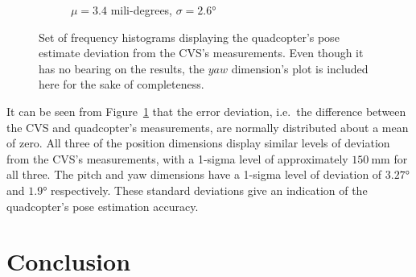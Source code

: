 \begin{figure}
\begin{subfigure}{0.48\textwidth}
    \caption{$\mu = 3.4$ mili-degrees, $\sigma = \ang{2.6}$}
  \end{subfigure}
  \caption[Set of frequency histograms displaying the quadcopter's pose estimate deviation from the CVS's measurements.]{Set of frequency histograms displaying the quadcopter's pose estimate deviation from the CVS's measurements. Even though it has no bearing on the results, the $yaw$ dimension's plot is included here for the sake of completeness.}
\label{fig:chap5-err-hist}
\end{figure}

It can be seen from Figure~\ref{fig:chap5-err-hist} that the error deviation, i.e.\ the difference between the CVS and quadcopter's measurements, are normally distributed about a mean of zero. All three of the position dimensions display similar levels of deviation from the CVS's measurements, with a 1-sigma level of approximately $\SI{150}{\mm}$ for all three. The pitch and yaw dimensions have a 1-sigma level of deviation of $\ang{3.27}$ and $\ang{1.9}$ respectively. These standard deviations give an indication of the quadcopter's pose estimation accuracy. 



\section{Conclusion}

